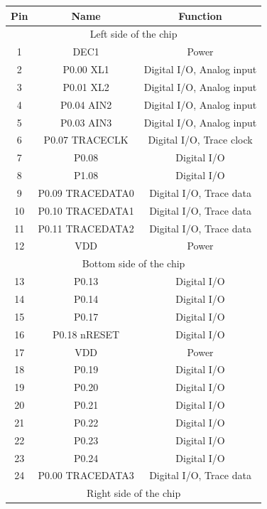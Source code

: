 \begin{table}[H]
    \centering
    \begin{tabular}{|c|c|c|}
        \hline
        \textbf{Pin} & \textbf{Name} & \textbf{Function} \\
        \hline
        \multicolumn{3}{|c|}{Left side of the chip} \\
        \hline
        1 & DEC1 & Power \\
        2 & P0.00 XL1 & Digital I/O, Analog input \\
        3 & P0.01 XL2 & Digital I/O, Analog input \\
        4 & P0.04 AIN2 & Digital I/O, Analog input \\
        5 & P0.03 AIN3 & Digital I/O, Analog input \\
        6 & P0.07 TRACECLK & Digital I/O, Trace clock \\
        7 & P0.08 & Digital I/O \\
        8 & P1.08 & Digital I/O \\
        9 & P0.09 TRACEDATA0 & Digital I/O, Trace data \\
        10 & P0.10 TRACEDATA1 & Digital I/O, Trace data \\
        11 & P0.11 TRACEDATA2 & Digital I/O, Trace data \\
        12 & VDD & Power \\
        \hline
        \multicolumn{3}{|c|}{Bottom side of the chip} \\
        \hline
        13 & P0.13 & Digital I/O \\
        14 & P0.14 & Digital I/O \\
        15 & P0.17 & Digital I/O \\
        16 & P0.18 nRESET & Digital I/O \\
        17 & VDD & Power \\
        18 & P0.19 & Digital I/O \\
        19 & P0.20 & Digital I/O \\
        20 & P0.21 & Digital I/O \\
        21 & P0.22 & Digital I/O \\
        22 & P0.23 & Digital I/O \\
        23 & P0.24 & Digital I/O \\
        24 & P0.00 TRACEDATA3 & Digital I/O, Trace data \\
        \hline
        \multicolumn{3}{|c|}{Right side of the chip} \\

\end{tabular}
\end{table}
